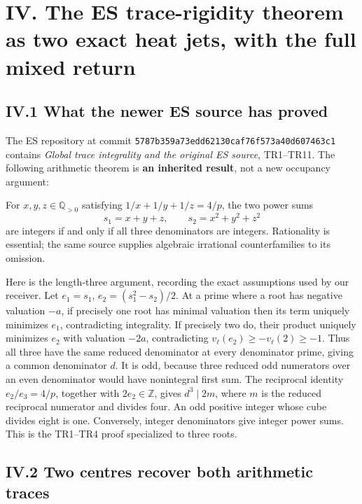 \section{IV. The ES trace-rigidity theorem as two exact heat jets, with the full mixed return}\label{iv.-the-es-trace-rigidity-theorem-as-two-exact-heat-jets-with-the-full-mixed-return}

\subsection{IV.1 What the newer ES source has proved}\label{iv.1-what-the-newer-es-source-has-proved}

The ES repository at commit \nolinkurl{5787b359a73edd62130caf76f573a40d607463c1} contains \emph{Global trace integrality and the original ES source}, TR1--TR11. The following arithmetic theorem is \textbf{an inherited result}, not a new occupancy argument:

For \(x,y,z\in\mathbb Q_{>0}\) satisfying \(1/x+1/y+1/z=4/p\), the two power sums \[
 s_1=x+y+z,\qquad s_2=x^2+y^2+z^2
\] are integers if and only if all three denominators are integers. Rationality is essential; the same source supplies algebraic irrational counterfamilies to its omission.

Here is the length-three argument, recording the exact assumptions used by our receiver. Let \(e_1=s_1\), \(e_2=(s_1^2-s_2)/2\). At a prime where a root has negative valuation \(-a\), if precisely one root has minimal valuation then its term uniquely minimizes \(e_1\), contradicting integrality. If precisely two do, their product uniquely minimizes \(e_2\) with valuation \(-2a\), contradicting \(v_\ell(e_2)\ge-v_\ell(2)\ge-1\). Thus all three have the same reduced denominator at every denominator prime, giving a common denominator \(d\). It is odd, because three reduced odd numerators over an even denominator would have nonintegral first sum. The reciprocal identity \(e_2/e_3=4/p\), together with \(2e_2\in\mathbb Z\), gives \(d^3\mid2m\), where \(m\) is the reduced reciprocal numerator and divides four. An odd positive integer whose cube divides eight is one. Conversely, integer denominators give integer power sums. This is the TR1--TR4 proof specialized to three roots.

\subsection{IV.2 Two centres recover both arithmetic traces}\label{iv.2-two-centres-recover-both-arithmetic-traces}

